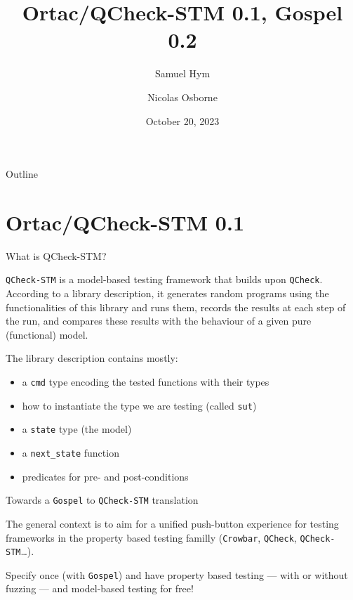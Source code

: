 \documentclass[pdf]{beamer}
\title{Ortac/QCheck-STM 0.1, Gospel 0.2}
\author{
  Samuel Hym
  \and
  Nicolas Osborne
}
\date{October 20, 2023}
\begin{document}
\begin{frame}
  \titlepage
\end{frame}

\begin{frame}{Outline}
    \tableofcontents[hideallsubsections]
\end{frame}


\section{Ortac/QCheck-STM 0.1}

\begin{frame}{What is QCheck-STM?}

  \texttt{QCheck-STM} is a model-based testing framework that builds upon
  \texttt{QCheck}. According to a library description, it generates random
  programs using the functionalities of this library and runs them, records
  the results at each step of the run, and compares these results with the
  behaviour of a given pure (functional) model.

\end{frame}

\begin{frame}

  The library description contains mostly:

  \begin{itemize}

    \item a \texttt{cmd} type encoding the tested functions with their types
    \item how to instantiate the type we are testing (called \texttt{sut})
    \item a \texttt{state} type (the model)
    \item a \texttt{next\_state} function
    \item predicates for pre- and post-conditions

  \end{itemize}

\end{frame}

\begin{frame}{Towards a \texttt{Gospel} to \texttt{QCheck-STM} translation}

  The general context is to aim for a unified push-button experience for
  testing frameworks in the property based testing familly (\texttt{Crowbar},
  \texttt{QCheck}, \texttt{QCheck-STM}\dots).

  Specify once (with \texttt{Gospel}) and have property based testing ---
  with or without fuzzing --- and model-based testing for free!

\end{frame}
\end{document}
